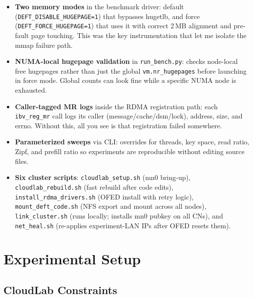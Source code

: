 \documentclass[10pt]{article}
\begin{document}
\begin{itemize}[nosep]
  \item \textbf{Two memory modes} in the benchmark driver:
    default (\texttt{DEFT\_DISABLE\_HUGEPAGE=1}) that bypasses hugetlb,
    and force (\texttt{DEFT\_FORCE\_HUGEPAGE=1}) that uses it with correct
    2\,MB alignment and pre-fault page touching.
    This was the key instrumentation that let me isolate the mmap failure path.

  \item \textbf{NUMA-local hugepage validation} in \texttt{run\_bench.py}:
    checks node-local free hugepages rather than just the global
    \texttt{vm.nr\_hugepages} before launching in force mode.
    Global counts can look fine while a specific NUMA node is exhausted.

  \item \textbf{Caller-tagged MR logs} inside the RDMA registration path:
    each \texttt{ibv\_reg\_mr} call logs its caller (message/cache/dsm/lock),
    address, size, and errno.
    Without this, all you see is that registration failed somewhere.

  \item \textbf{Parameterized sweeps} via CLI: overrides for threads,
    key space, read ratio, Zipf, and prefill ratio so experiments are
    reproducible without editing source files.

  \item \textbf{Six cluster scripts}:
    \texttt{cloudlab\_setup.sh} (mn0 bring-up),
    \texttt{cloudlab\_rebuild.sh} (fast rebuild after code edits),
    \texttt{install\_rdma\_drivers.sh} (OFED install with retry logic),
    \texttt{mount\_deft\_code.sh} (NFS export and mount across all nodes),
    \texttt{link\_cluster.sh} (runs locally; installs mn0 pubkey on all CNs),
    and \texttt{net\_heal.sh} (re-applies experiment-LAN IPs after OFED resets them).
\end{itemize}

\section{Experimental Setup}

\subsection{CloudLab Constraints}
\end{document}
